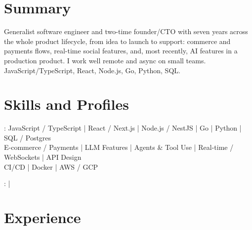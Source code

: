 \documentclass[print]{jack-resume}
\begin{document}
\pagecolor{darkmodeBackground}


\begin{minipage}[t][1cm][t]{.03\textwidth}
    \hfill
\end{minipage}

\section{Summary}
Generalist software engineer and two-time founder/CTO with seven years across the whole product lifecycle, from idea to launch to support: commerce and payments flows, real-time social features, and, most recently, AI features in a production product. I work well remote and async on small teams. JavaScript/TypeScript, React, Node.js, Go, Python, SQL.
\sectionsep

\section{Skills and Profiles}
:
JavaScript / TypeScript \hfill | \hfill
React / Next.js \hfill | \hfill
Node.js / NestJS \hfill | \hfill
Go \hfill | \hfill
Python \hfill | \hfill
SQL / Postgres \\
\hspace{1.0cm} E-commerce / Payments \hfill | \hfill
LLM Features \hfill | \hfill
Agents \& Tool Use \hfill | \hfill
Real-time / WebSockets \hfill | \hfill
API Design \\
\hspace{1.0cm} CI/CD \hfill | \hfill
Docker \hfill | \hfill
AWS / GCP \\

\raggedright{
    :
      \href{https://www.linkedin.com/in/jack-sturtevant/}{ \ExternalLink} |
     \href{https://github.com/jacksturt}{ \ExternalLink}}

\section{Experience}
\end{document}
